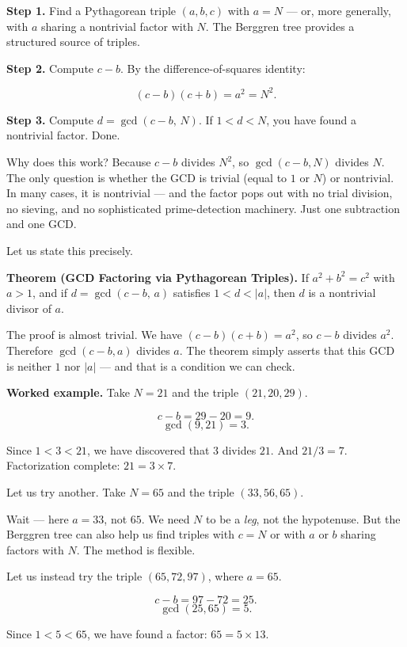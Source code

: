 \textbf{Step 1.} Find a Pythagorean triple $(a, b, c)$ with $a = N$ --- or, more generally, with $a$ sharing a nontrivial factor with $N$. The Berggren tree provides a structured source of triples.

\textbf{Step 2.} Compute $c - b$. By the difference-of-squares identity:

\[(c - b)(c + b) = a^2 = N^2.\]

\textbf{Step 3.} Compute $d = \gcd(c - b, \, N)$. If $1 < d < N$, you have found a nontrivial factor. Done.

Why does this work? Because $c - b$ divides $N^2$, so $\gcd(c - b, N)$ divides $N$. The only question is whether the GCD is trivial (equal to $1$ or $N$) or nontrivial. In many cases, it is nontrivial --- and the factor pops out with no trial division, no sieving, and no sophisticated prime-detection machinery. Just one subtraction and one GCD.

Let us state this precisely.

\textbf{Theorem (GCD Factoring via Pythagorean Triples).} If $a^2 + b^2 = c^2$ with $a > 1$, and if $d = \gcd(c - b, \, a)$ satisfies $1 < d < |a|$, then $d$ is a nontrivial divisor of $a$.

The proof is almost trivial. We have $(c - b)(c + b) = a^2$, so $c - b$ divides $a^2$. Therefore $\gcd(c - b, a)$ divides $a$. The theorem simply asserts that this GCD is neither $1$ nor $|a|$ --- and that is a condition we can check.

\textbf{Worked example.} Take $N = 21$ and the triple $(21, 20, 29)$.

\[c - b = 29 - 20 = 9.\]
\[\gcd(9, 21) = 3.\]

Since $1 < 3 < 21$, we have discovered that $3$ divides $21$. And $21 / 3 = 7$. Factorization complete: $21 = 3 \times 7$.

Let us try another. Take $N = 65$ and the triple $(33, 56, 65)$.

Wait --- here $a = 33$, not $65$. We need $N$ to be a \textit{leg}, not the hypotenuse. But the Berggren tree can also help us find triples with $c = N$ or with $a$ or $b$ sharing factors with $N$. The method is flexible.

Let us instead try the triple $(65, 72, 97)$, where $a = 65$.

\[c - b = 97 - 72 = 25.\]
\[\gcd(25, 65) = 5.\]

Since $1 < 5 < 65$, we have found a factor: $65 = 5 \times 13$. 

